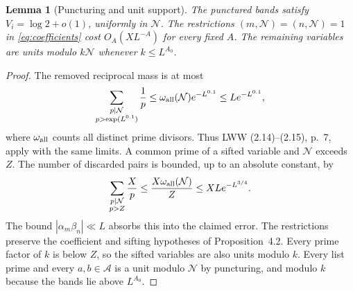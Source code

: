\documentclass[11pt]{article}
\newtheorem{lemma}[theorem]{Lemma}
\theoremstyle{definition}
\newcommand{\GN}{\mathcal N}
\newcommand{\Aset}{\mathcal A}
\theoremstyle{remark}
\numberwithin{equation}{section}
\begin{document}
\begin{lemma}[Puncturing and unit support]\label{lem:puncturing}
The punctured bands satisfy $V_i=\log2+o(1)$, uniformly in $\GN$.
The restrictions $(m,\GN)=(n,\GN)=1$ in \eqref{eq:coefficients}
cost $O_A(XL^{-A})$ for every fixed $A$.
The remaining variables are units modulo $k\GN$ whenever $k\le L^{A_0}$.
\end{lemma}
\begin{proof}
The removed reciprocal mass is at most
\begin{equation}\label{eq:puncture-mass}
 \sum_{\substack{p\mid\GN\\p>\exp(L^{0.1})}}\frac1p
 \le\omega_{\rm all}(\GN)e^{-L^{0.1}}\le Le^{-L^{0.1}},
\end{equation}
where $\omega_{\rm all}$ counts all distinct prime divisors.
Thus LWW (2.14)--(2.15), p.~7, apply with the same limits.
A common prime of a sifted variable and $\GN$ exceeds $Z$.
The number of discarded pairs is bounded, up to an absolute constant, by
\begin{equation}\label{eq:unit-discard}
 \sum_{\substack{p\mid\GN\\p>Z}}\frac Xp
 \le\frac{X\omega_{\rm all}(\GN)}Z\le XLe^{-L^{3/4}}.
\end{equation}
The bound $|\alpha_m\beta_n|\ll L$ absorbs this into the claimed
error. The restrictions preserve the coefficient and sifting
hypotheses of Proposition~4.2. Every prime factor of $k$ is below
$Z$, so the sifted variables are also units modulo $k$.
Every list prime and every $a,b\in\Aset$ is a unit modulo $\GN$ by
puncturing, and modulo $k$ because the bands lie above $L^{A_0}$.
\end{proof}
\end{document}
